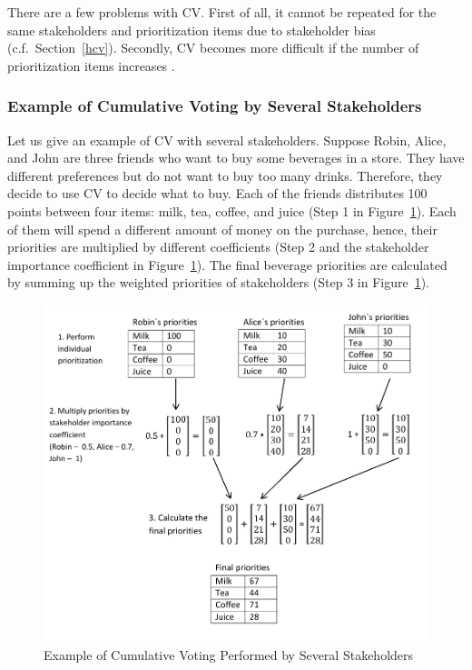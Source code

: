 There are a few problems with CV. First of all, it cannot be repeated for the
same stakeholders and prioritization items due to stakeholder bias
\citep{Leffingwell1999} (c.f.\ Section~\ref{hcv}). Secondly, CV becomes more difficult if the number of prioritization items increases \citep{Berander2009a}.

\subsubsection{Example of Cumulative Voting by Several Stakeholders}

Let us give an example of CV with several stakeholders. Suppose Robin,
Alice, and John are three friends who want to buy some beverages in
a store. They have different preferences but do not want to buy too
many drinks. Therefore, they decide to use CV to decide what to buy.
Each of the friends distributes 100 points between four items: milk,
tea, coffee, and juice (Step 1 in Figure~\ref{fig:Example-of-Cumulative}).
Each of them will spend a different amount of money on the purchase,
hence, their priorities are multiplied by different coefficients
(Step 2 and the stakeholder importance coefficient in Figure~\ref{fig:Example-of-Cumulative}).
The final beverage priorities are calculated by summing up the weighted priorities
of stakeholders (Step 3 in Figure~\ref{fig:Example-of-Cumulative}).


%
\begin{figure}
\includegraphics[scale=0.55]{fig/cv}

\caption{\label{fig:Example-of-Cumulative}Example of Cumulative Voting Performed
by Several Stakeholders}
%
\end{figure}

